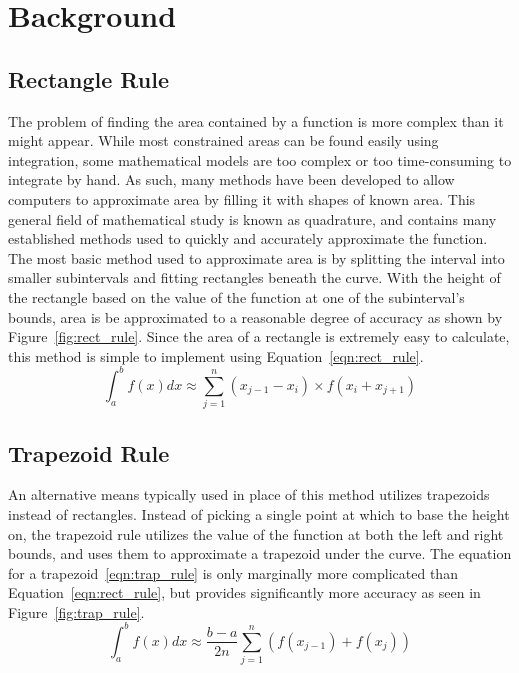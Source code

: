 \documentclass{paper}
\begin{document}
\thispagestyle{empty}
\insertTitlePage
\thispagestyle{empty}
\tableofcontents
\newpage
\setcounter{page}{1}

\section{Background}
\subsection{Rectangle Rule}
The problem of finding the area contained by a function is more complex than it might appear.
While most constrained areas can be found easily using integration, some mathematical models are too complex or too time-consuming to integrate by hand.
As such, many methods have been developed to allow computers to approximate area by filling it with shapes of known area.
This general field of mathematical study is known as quadrature, and contains many established methods used to quickly and accurately approximate the function.
The most basic method used to approximate area is by splitting the interval into smaller subintervals and fitting rectangles beneath the curve.
With the height of the rectangle based on the value of the function at one of the subinterval's bounds, area is be approximated to a reasonable degree of accuracy as shown by Figure~\ref{fig:rect_rule}.
Since the area of a rectangle is extremely easy to calculate, this method is simple to implement using Equation~\ref{eqn:rect_rule}.
%
\begin{equation}
    \label{eqn:rect_rule}
    \int_a^b f(x) dx \approx \sum_{j=1}^n (x_{j-1} - x_i) \times f(x_i + x_{j+1})
\end{equation}
%

%
\subsection{Trapezoid Rule}
An alternative means typically used in place of this method utilizes trapezoids instead of rectangles.
Instead of picking a single point at which to base the height on, the trapezoid rule utilizes the value of the function at both the left and right bounds, and uses them to approximate a trapezoid under the curve.
The equation for a trapezoid~\eqref{eqn:trap_rule} is only marginally more complicated than Equation~\ref{eqn:rect_rule}, but provides significantly more accuracy as seen in Figure~\ref{fig:trap_rule}.
%
\begin{equation}
    \label{eqn:trap_rule}
    \int_a^b f(x) dx \approx \dfrac{b - a}{2n} \sum_{j=1}^n (f(x_{j-1})+f(x_{j}))
\end{equation}
%

%
\end{document}
